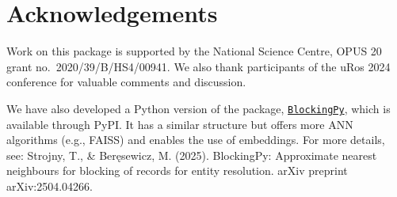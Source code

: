 \section{Acknowledgements}\label{acknowledgements}

Work on this package is supported by the National Science Centre, OPUS
20 grant no.~2020/39/B/HS4/00941. We also thank participants of the uRos
2024 conference for valuable comments and discussion.

We have also developed a Python version of the package,
\href{https://blockingpy.readthedocs.io/en/latest/}{\texttt{BlockingPy}}, which is
available through PyPI. It has a similar structure but offers more ANN
algorithms (e.g., FAISS) and enables the use of embeddings. For more
details, see: Strojny, T., \& Beręsewicz, M. (2025). BlockingPy:
Approximate nearest neighbours for blocking of records for entity
resolution. arXiv preprint arXiv:2504.04266.



\address{%
Maciej Beręsewicz\\
University of Economics and BusinessStatisical Office in Poznań\\%
Department of Statistics\\ Centre for the Methodology of Population Studies\\
%
\url{https://maciejberesewicz.com}\\%
\textit{ORCiD: \href{https://orcid.org/0000-0002-8281-4301}{0000-0002-8281-4301}}\\%
\href{mailto:maciej.beresewicz@poznan.pl}{\nolinkurl{maciej.beresewicz@poznan.pl}}%
}

\address{%
Adam Struzik\\
Adam Mickiewicz UniversityStatisical Office in Poznań\\%
Faculty of Mathematics and Computer Science\\ Centre for Urban Statistics\\
%
%
%
\href{mailto:adastr5@st.amu.edu.pl}{\nolinkurl{adastr5@st.amu.edu.pl}}%
}
